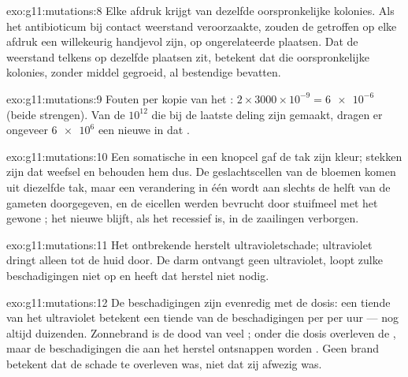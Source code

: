 \begin{solution}{exo:g11:mutations:8}
Elke afdruk krijgt  van dezelfde oorspronkelijke kolonies. Als het
antibioticum bij contact weerstand veroorzaakte, zouden de getroffen
 op elke afdruk een willekeurig handjevol zijn, op ongerelateerde
plaatsen. Dat de weerstand telkens op dezelfde plaatsen zit, betekent dat
die oorspronkelijke kolonies, zonder middel gegroeid, al bestendige
 bevatten.
\end{solution}

\begin{solution}{exo:g11:mutations:9}
Fouten per kopie van het : $2 \times 3000 \times 10^{-9} =
\num{6e-6}$ (beide strengen). Van de $10^{12}$  die bij de laatste
deling zijn gemaakt, dragen er ongeveer $\num{6e6}$ een nieuwe  in
dat .
\end{solution}

\begin{solution}{exo:g11:mutations:10}
Een somatische  in een knopcel gaf de tak zijn kleur; stekken zijn
dat weefsel en behouden hem dus. De geslachtscellen van de bloemen komen
uit diezelfde tak, maar een verandering in één  wordt aan slechts de
helft van de gameten doorgegeven, en de eicellen werden bevrucht door
stuifmeel met het gewone ; het nieuwe  blijft, als het
recessief is, in de zaailingen verborgen.
\end{solution}

\begin{solution}{exo:g11:mutations:11}
Het ontbrekende  herstelt ultravioletschade; ultraviolet dringt
alleen tot de huid door. De darm ontvangt geen ultraviolet, loopt zulke
beschadigingen niet op en heeft dat herstel niet nodig.
\end{solution}

\begin{solution}{exo:g11:mutations:12}
De beschadigingen zijn evenredig met de dosis: een tiende van het
ultraviolet betekent een tiende van de beschadigingen per  per uur ---
nog altijd duizenden. Zonnebrand is de dood van veel ; onder die
dosis overleven de , maar de beschadigingen die aan het herstel
ontsnappen worden . Geen brand betekent dat de schade te
overleven was, niet dat zij afwezig was.
\end{solution}

